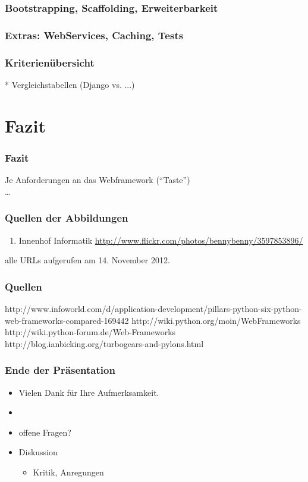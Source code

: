 \documentclass[
    t,
    smaller,
    compress,
]{beamer}
\begin{document}
\begin{frame}
  \frametitle{Bootstrapping, Scaffolding, Erweiterbarkeit}
\end{frame}


\begin{frame}
  \frametitle{Extras: WebServices, Caching, Tests}
\end{frame}


\begin{frame}
  \frametitle{Kriterienübersicht}
 * Vergleichstabellen (Django vs. ...)
\end{frame}


\section{Fazit}
\begin{frame}
  \frametitle{Fazit}

  Je Anforderungen an das Webframework (“Taste”)\\
  \dots
\end{frame}


\begin{frame}
  \frametitle{Quellen der Abbildungen}
  \footnotesize
  \begin{enumerate}[<1->]
    \item Innenhof Informatik
        \url{http://www.flickr.com/photos/bennybenny/3597853896/} \label{illu:1}
  \end{enumerate}
  alle URLs aufgerufen am 14. November 2012.
\end{frame}


\begin{frame}
  \frametitle{Quellen}
http://www.infoworld.com/d/application-development/pillars-python-six-python-web-frameworks-compared-169442
http://wiki.python.org/moin/WebFrameworks
http://wiki.python-forum.de/Web-Frameworks
http://blog.ianbicking.org/turbogears-and-pylons.html
\end{frame}


\begin{frame}
    \frametitle{Ende der Präsentation}
    \LARGE
    \begin{itemize}[<1->]
        \item Vielen Dank für Ihre Aufmerksamkeit.
        \item
        \item offene Fragen?
        \item Diskussion
        \begin{itemize}[<1->]
          \Large
          \item Kritik, Anregungen
        \end{itemize}
    \end{itemize}
\end{frame}
\end{document}
